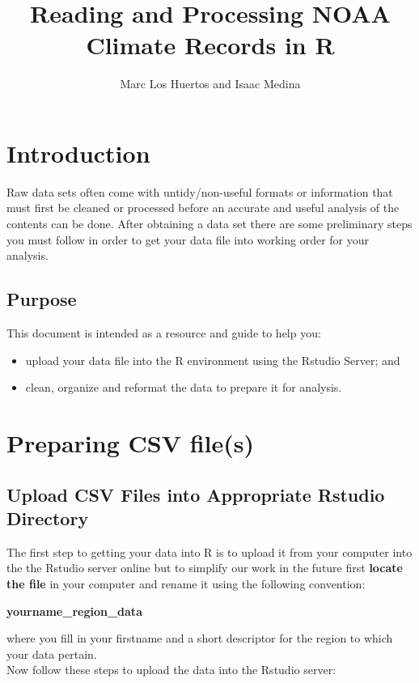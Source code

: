 \documentclass{article}\usepackage[]{graphicx}\usepackage[]{color}
\title{Reading and Processing NOAA Climate Records in R}
\author{Marc Los Huertos and Isaac Medina}
\begin{document}
\maketitle

\section{Introduction}
Raw data sets often come with untidy/non-useful formats or information that must first be cleaned or processed before an accurate and useful analysis of the contents can be done. After obtaining a data set there are some preliminary steps you must follow in order to get your data file into working order for your analysis. 

\subsection{Purpose}
This document is intended as a resource and guide to help you: 
\begin{itemize}
\item upload your data file into the R environment using the Rstudio Server; and 
\item clean, organize and reformat the data to prepare it for analysis. 
\end{itemize}


\section{Preparing CSV file(s)}

\subsection{Upload CSV Files into Appropriate Rstudio Directory} 
The first step to getting your data into R is to upload it from your computer into the the Rstudio server online but to simplify our work in the future first \textbf{locate the file} in your computer and rename it using the following convention: \\ 
\begin{center}
\textbf{yourname\_region\_data}
\end{center}
where you fill in your firstname and a short descriptor for the region to which your data pertain. \\

Now follow these steps to upload the data into the Rstudio server:
\end{document}
